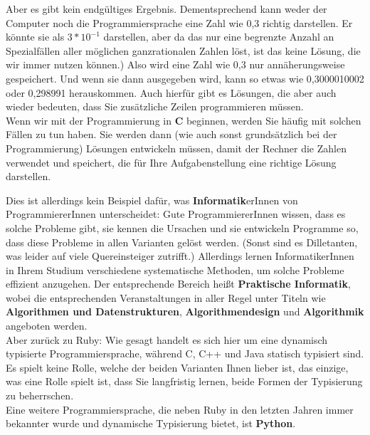 \begin{enumerate}
	Aber es gibt kein endgültiges Ergebnis. Dementsprechend kann weder der Computer noch die Programmiersprache eine Zahl wie 0,3 richtig darstellen. Er könnte sie als \(3 * 10^{-1}\) darstellen, aber da das nur eine begrenzte Anzahl an Spezialfällen aller möglichen ganzrationalen Zahlen löst, ist das keine Lösung, die wir immer nutzen können.) Also wird eine Zahl wie 0,3 nur annäherungsweise gespeichert. Und wenn sie dann ausgegeben wird, kann so etwas wie 0,3000010002 oder 0,298991 herauskommen. Auch hierfür gibt es Lösungen, die aber auch wieder bedeuten, dass Sie zusätzliche Zeilen programmieren müssen.\\
	
	Wenn wir mit der Programmierung in \textbf{C} beginnen, werden Sie häufig mit solchen Fällen zu tun haben. Sie werden dann (wie auch sonst grundsätzlich bei der Programmierung) Lösungen entwickeln müssen, damit der Rechner die Zahlen verwendet und speichert, die für Ihre Aufgabenstellung eine richtige Lösung darstellen.\\
	
\end{enumerate}

Dies ist allerdings kein Beispiel dafür, was \textbf{Informatik}erInnen von ProgrammiererInnen unterscheidet: Gute ProgrammiererInnen wissen, dass es solche Probleme gibt, sie kennen die Ursachen und sie entwickeln Programme so, dass diese Probleme in allen Varianten gelöst werden. (Sonst sind es Dilletanten, was leider auf viele Quereinsteiger zutrifft.) Allerdings lernen InformatikerInnen in Ihrem Studium verschiedene systematische Methoden, um solche Probleme effizient anzugehen. Der entsprechende Bereich heißt \textbf{Praktische Informatik}, wobei die entsprechenden Veranstaltungen in aller Regel unter Titeln wie \textbf{Algorithmen und Datenstrukturen}, \textbf{Algorithmendesign} und \textbf{Algorithmik} angeboten werden.\\

Aber zurück zu Ruby: Wie gesagt handelt es sich hier um eine dynamisch typisierte Programmiersprache, während C, C++ und Java statisch typisiert sind. Es spielt keine Rolle, welche der beiden Varianten Ihnen lieber ist, das einzige, was eine Rolle spielt ist, dass Sie langfristig lernen, beide Formen der Typisierung zu beherrschen.\\

Eine weitere Programmiersprache, die neben Ruby in den letzten Jahren immer bekannter wurde und dynamische Typisierung bietet, ist \textbf{Python}.\\

